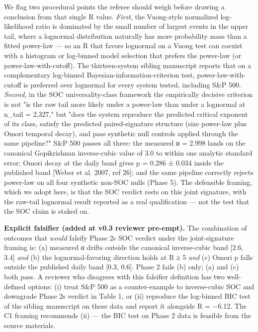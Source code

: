 \documentclass[
  11pt]{article}
\begin{document}
We flag two procedural points the referee should weigh before drawing a
conclusion from that single R value. \emph{First}, the Vuong-style
normalized log-likelihood ratio is dominated by the small number of
largest events in the upper tail, where a lognormal distribution
naturally has more probability mass than a fitted power-law --- so an R
that favors lognormal on a Vuong test can coexist with a histogram or
log-binned model selection that prefers the power-law (or
power-law-with-cutoff). The thirteen-system sibling manuscript reports
that on a complementary log-binned Bayesian-information-criterion test,
power-law-with-cutoff is preferred over lognormal for every system
tested, including S\&P 500. \emph{Second}, in the SOC universality-class
framework the empirically decisive criterion is not "is the raw tail
more likely under a power-law than under a lognormal at n\_tail =
2,327," but "does the system reproduce the predicted critical exponent
of its class, satisfy the predicted paired-signature structure (size
power-law plus Omori temporal decay), and pass synthetic null controls
applied through the same pipeline?" S\&P 500 passes all three: the
measured α = 2.998 lands on the canonical Gopikrishnan inverse-cubic
value of 3.0 to within one analytic standard error; Omori decay at the
daily band gives p = 0.286 ± 0.034 inside the published band {[}Weber et
al. 2007, ref 26{]}; and the same pipeline correctly rejects power-law
on all four synthetic non-SOC nulls (Phase 5). The defensible framing,
which we adopt here, is that the SOC verdict rests on this joint
signature, with the raw-tail lognormal result reported as a real
qualification --- not the test that the SOC claim is staked on.

\textbf{Explicit falsifier (added at v0.3 reviewer pre-empt).} The
combination of outcomes that \emph{would} falsify Phase
2\textquotesingle s SOC verdict under the joint-signature framing is:
(a) measured α drifts outside the canonical inverse-cubic band {[}2.6,
3.4{]} \emph{and} (b) the lognormal-favoring direction holds at
\textbar R\textbar{} ≥ 5 \emph{and} (c) Omori p falls outside the
published daily band {[}0.3, 0.6{]}. Phase 2 fails (b) only; (a) and (c)
both pass. A reviewer who disagrees with this falsifier definition has
two well-defined options: (i) treat S\&P 500 as a counter-example to
inverse-cubic SOC and downgrade Phase 2\textquotesingle s verdict in
Table 1, or (ii) reproduce the log-binned BIC test of the sibling
manuscript on these data and report it alongside R = −6.12. The C1
framing recommends (ii) --- the BIC test on Phase 2 data is feasible
from the source materials.
\end{document}

